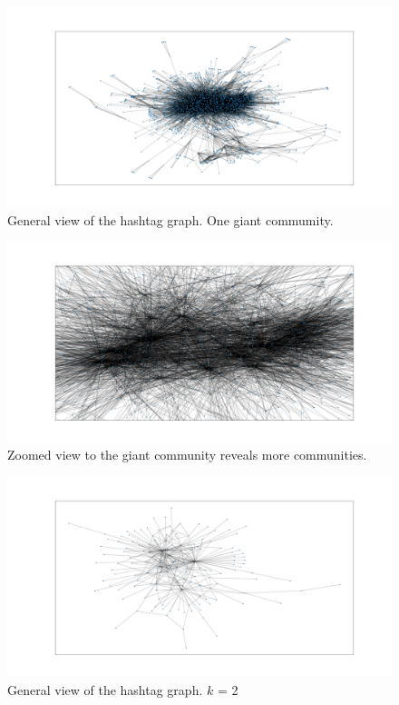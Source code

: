 \documentclass[conference]{IEEEtran}
\begin{document}
    \begin{figure}
        \includegraphics[scale=0.32]{figures/general_graph}
        \caption{General view of the hashtag graph. One giant commumity.}
        \label{fig:graph-general}
    \end{figure}

    \begin{figure}
        \includegraphics[scale=0.32]{figures/general_graph_zoomed}
        \caption{Zoomed view to the giant community reveals more communities.}
        \label{fig:graph-general-zoomed}
    \end{figure}
    \begin{figure}
        \includegraphics[scale=0.32]{figures/general_graph_k_2}
        \caption{General view of the hashtag graph. $k$ = 2}
        \label{fig:graph-general-k2}
    \end{figure}
\end{document}
